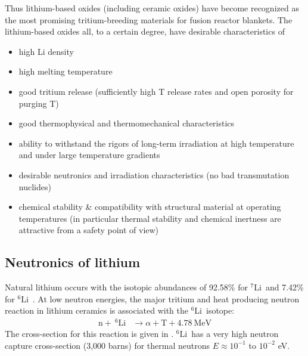 \documentclass[11pt]{report} %
\newcommand{\lisev}{$^7\mathrm{Li}$}
\newcommand{\lisix}{$^6\mathrm{Li}$}
\begin{document}
Thus lithium-based oxides (including ceramic oxides) have become recognized as the most promising tritium-breeding materials for fusion reactor blankets. The lithium-based oxides all, to a certain degree, have desirable characteristics of 
\begin{itemize}
\item{high Li density}
\item{high melting temperature}
\item good tritium release (sufficiently high T release rates and open porosity for purging T)
\item good thermophysical and thermomechanical characteristics
\item ability to withstand the rigors of long-term irradiation at high temperature and under large temperature gradients
\item{desirable neutronics and irradiation characteristics (no bad transmutation nuclides)}
\item{chemical stability \& compatibility with structural material at operating temperatures (in particular thermal stability and chemical inertness are attractive from a safety point of view)}
\end{itemize}



\subsection{Neutronics of lithium}
Natural lithium occurs with the isotopic abundances of 92.58\% for \lisev~and 7.42\% for \lisix~. At low neutron energies, the major tritium and heat producing neutron reaction in lithium ceramics is associated with the \lisix~isotope:
\begin{align}
\mathrm{n} + ~^6\mathrm{Li} &\xrightarrow ~ \alpha + \mathrm{T} +4.78~\text{MeV} \label{eq:Li6T}
\end{align}
The cross-section for this reaction is given in . \lisix~has a very high neutron capture cross-section (3,000 barns) for thermal neutrons $E \approx 10^{-1}$ to $10^{-2}$ eV.
\end{document}
